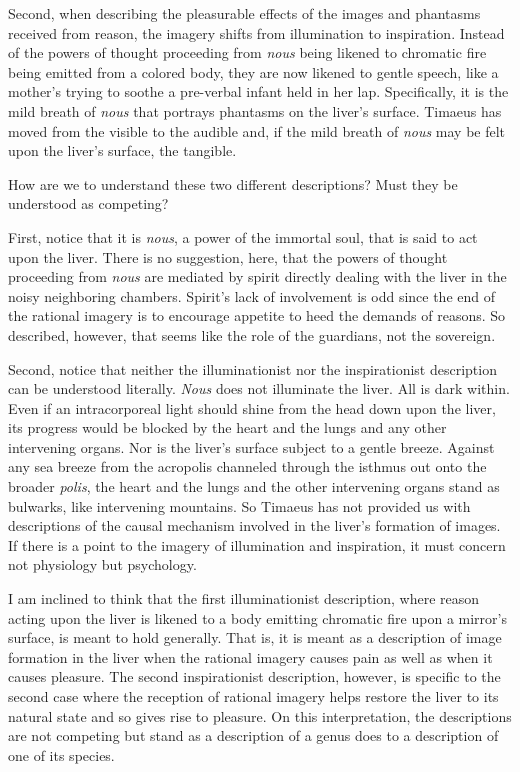 Second, when describing the pleasurable effects of the images and phantasms received from reason, the imagery shifts from illumination to inspiration. Instead of the powers of thought proceeding from \emph{nous} being likened to chromatic fire being emitted from a colored body, they are now likened to gentle speech, like a mother's trying to soothe a pre-verbal infant held in her lap. Specifically, it is the mild breath of \emph{nous} that portrays phantasms on the liver's surface. Timaeus has moved from the visible to the audible and, if the mild breath of \emph{nous} may be felt upon the liver's surface, the tangible. 

How are we to understand these two different descriptions? Must they be understood as competing?

First, notice that it is \emph{nous}, a power of the immortal soul, that is said to act upon the liver. There is no suggestion, here, that the powers of thought proceeding from \emph{nous} are mediated by spirit directly dealing with the liver in the noisy neighboring chambers. Spirit's lack of involvement is odd since the end of the rational imagery is to encourage appetite to heed the demands of reasons. So described, however, that seems like the role of the guardians, not the sovereign. 

Second, notice that neither the illuminationist nor the inspirationist description can be understood literally. \emph{Nous} does not illuminate the liver. All is dark within. Even if an intracorporeal light should shine from the head down upon the liver, its progress would be blocked by the heart and the lungs and any other intervening organs. Nor is the liver's surface subject to a gentle breeze. Against any sea breeze from the acropolis channeled through the isthmus out onto the broader \emph{polis}, the heart and the lungs and the other intervening organs stand as bulwarks, like intervening mountains. So Timaeus has not provided us with descriptions of the causal mechanism involved in the liver's formation of images. If there is a point to the imagery of illumination and inspiration, it must concern not physiology but psychology. 

I am inclined to think that the first illuminationist description, where reason acting upon the liver is likened to a body emitting chromatic fire upon a mirror's surface, is meant to hold generally. That is, it is meant as a description of image formation in the liver when the rational imagery causes pain as well as when it causes pleasure. The second inspirationist description, however, is specific to the second case where the reception of rational imagery helps restore the liver to its natural state and so gives rise to pleasure. On this interpretation, the descriptions are not competing but stand as a description of a genus does to a description of one of its species.

